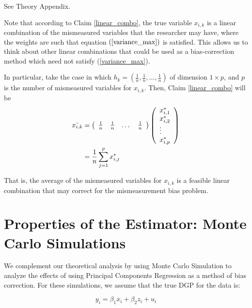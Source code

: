 \documentclass[10pt]{article}
\makeatletter
\renewenvironment{proof}[1][\proofname] {\par\pushQED{\qed}\normalfont\topsep6\p@\@plus6\p@\relax\trivlist\item[\hskip\labelsep\bfseries#1\@addpunct{.}]\ignorespaces}{\popQED\endtrivlist\@endpefalse}
\makeatother
\begin{document}
        \begin{proof}
            See Theory Appendix.
        \end{proof}
        
        Note that according to Claim \ref{linear_combo}, the true variable $x_{i,k}$ is a linear combination of the mismeasured variables that the researcher may have, where the weights are such that equation $(\ref{variance_max})$ is satisfied. This allows us to think about other linear combinations that could be used as a bias-correction method which need not satisfy (\ref{variance_max}). 
        
        In particular, take the case in which $h_k=(\frac{1}{n},\frac{1}{n},\dots,\frac{1}{n})$ of dimension $1 \times p$, and $p$ is the number of mismeasured variables for $x_{i,k}$. Then, Claim \ref{linear_combo} will be
        \begin{align}
            \Tilde{x_{i,k}}&=\left(\begin{array}{cccc}
            \frac{1}{n} & \frac{1}{n} & \dots &\frac{1}{n} 
            \end{array}\right)\left(\begin{array}{l}
            x^*_{i,1} \\
            x^*_{i,2} \\
            \vdots \\
            x^*_{i,p} 
            \end{array}\right)\\
            &=\frac{1}{n}\sum_{j=1}^p x^*_{i,j}
        \end{align}
        
        That is, the average of the mismeasured variables for $x_{i,k}$ is a feasible linear combination that may correct for the mismeasurement bias problem.

    \section*{Properties of the Estimator: Monte Carlo Simulations}

        We complement our theoretical analysis by using Monte Carlo Simulation to analyze the effects of using Principal Components Regression as a method of bias correction. For these simulations, we assume that the true DGP for the data is:

        $$y_i = \beta_1 x_i + \beta_2 z_i + u_i$$
\end{document}
